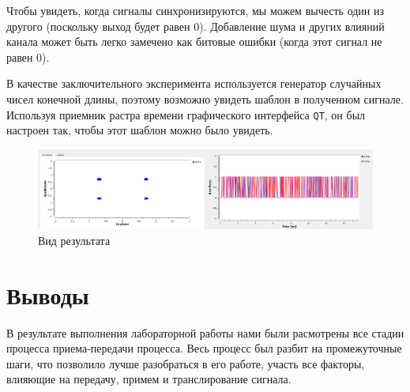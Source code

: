 \documentclass[a4paper]{article}
\begin{document}
            Чтобы увидеть, когда сигналы синхронизируются, мы можем вычесть один из другого (поскольку выход будет равен 0). Добавление шума и других влияний канала может быть легко замечено как битовые ошибки (когда этот сигнал не равен 0). 
            
            В качестве заключительного эксперимента используется генератор случайных чисел конечной длины, поэтому возможно увидеть шаблон в полученном сигнале. Используя приемник растра времени графического интерфейса \texttt{QT}, он был настроен так, чтобы этот шаблон можно было увидеть.
            
            \begin{figure}[H]
                \centering
                \includegraphics[width=\textwidth]{ex_8_2.png}
                \caption{Вид результата}
                \label{fig:ex_8_2}
            \end{figure}
            
    \newpage
        \section{Выводы}
            В результате выполнения лабораторной работы нами были расмотрены все стадии процесса приема-передачи процесса. Весь процесс был разбит на промежуточные шаги, что позволило лучше разобраться в его работе, участь все факторы, влияющие на передачу, примем и транслирование сигнала.
            
\end{document}

